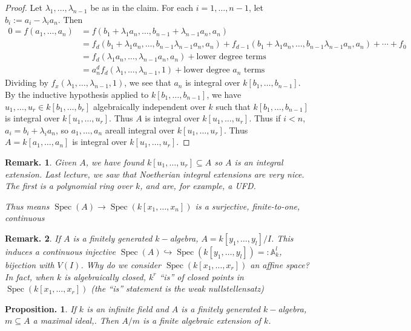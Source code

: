 \documentclass[11pt, a4paper]{memoir}
\newcommand{\hto}[0]{\ensuremath{\hookrightarrow}}
\theoremstyle{change}
\newtheorem{proposition}[theorem]{Proposition.}
\theoremstyle{plain}
\theoremstyle{nonumberplain}
\newtheorem{remark}{Remark.}
\newtheorem{proof}{Proof}
\DeclareMathOperator{\Spec}{Spec}
\numberwithin{equation}{section}
\begin{document}
\begin{proof}
    Let $\lambda_1,\ldots,\lambda_{n-1}$ be as in the claim.
    For each $i=1,\ldots,n-1$, let $b_i:=a_i-\lambda_ia_n$.
    Then
    \begin{align*}
        0=f(a_1,\ldots,a_n) &= f(b_1+\lambda_1a_n,\ldots,b_{n-1}+\lambda_{n-1}a_n,a_n)\\
                            &= f_d(b_1+\lambda_1 a_n,\ldots,b_{n-1}\lambda_{n-1}a_n,a_n)+f_{d-1}(b_1+\lambda_1 a_n,\ldots,b_{n-1}\lambda_{n-1}a_n,a_n)+\cdots+f_0\\
                            &= f_d(\lambda_1a_n,\ldots,\lambda_{n-1}a_n,a_n)+\text{lower degree terms}\\
                            &= a_n^df_d(\lambda_1,\ldots,\lambda_{n-1},1)+\text{lower degree $a_n$ terms}
    \end{align*}
    Dividing by $f_x(\lambda_1,\ldots,\lambda_{n-1},1)$, we see that $a_n$ is integral over $k[b_1,\ldots,b_{n-1}]$.
    By the inductive hypothesis applied to $k[b_1,\ldots,b_{n-1}]$, we have $u_1,\ldots,u_r\in k[b_1,\ldots,b_r]$ algebraically independent over $k$ such that $k[b_1,\ldots,b_{n-1}]$ is integral over $k[u_1,\ldots,u_r]$.
    Thus $A$ is integral over $k[u_1,\ldots,u_r]$.
    Thus if $i<n$, $a_i=b_i+\lambda_ia_n$, so $a_1,\ldots,a_n$ areall integral over $k[u_1,\ldots,u_r]$.
    Thus $A=k[a_1,\ldots,a_n]$ is integral over $k[u_1,\ldots,u_r]$.
\end{proof}
\begin{remark}
    Given $A$, we have found $k[u_1,\ldots,u_r]\subseteq A$ so $A$ is an integral extension.
    Last lecture, we saw that Noetherian integral extensions are very nice.
    The first is a polynomial ring over $k$, and are, for example, a UFD.

    Thus means $\Spec(A)\to\Spec(k[x_1,\ldots,x_n])$ is a surjective, finite-to-one, continuous
\end{remark}
\begin{remark}
    If $A$ is a finitely generated $k-$algebra, $A=k[y_1,\ldots,y_l]/I$.
    This induces a continuous injective $\Spec(A)\hto\Spec(k[y_1,\ldots,y_l])=:\mathbb{A}_k^l$, bijection with $V(I)$.
    Why do we consider $\Spec(k[x_1,\ldots,x_r])$ an affine space?
    In fact, when $k$ is algebraically closed, $k^r$ ``is'' of closed points in $\Spec(k[x_1,\ldots,x_r])$ (the ``is'' statement is the weak nullstellensatz)
\end{remark}
\begin{proposition}
    If $k$ is an infinite field and $A$ is a finitely generated $k-$algebra, $m\subseteq A$ a maximal ideal,.
    Then $A/m$ is a finite algebraic extension of $k$.
\end{proposition}
\end{document}

